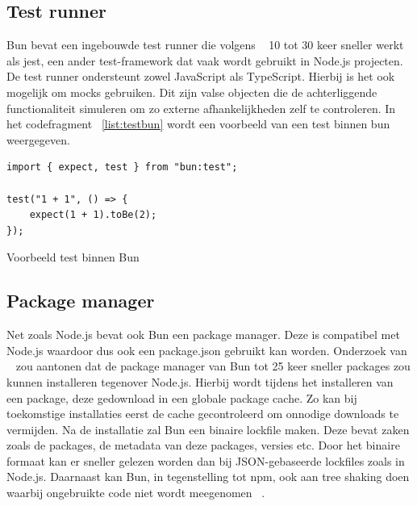 \subsection{Test runner}
Bun bevat een ingebouwde test runner die volgens ~\textcite{McDonnel2023} 10 tot 30 keer sneller werkt als jest, een ander test-framework dat vaak wordt gebruikt in Node.js projecten.
De test runner ondersteunt zowel JavaScript als TypeScript. Hierbij is het ook mogelijk om mocks gebruiken.
Dit zijn valse objecten die de achterliggende functionaliteit simuleren om zo externe afhankelijkheden zelf te controleren.
In het codefragment ~\ref{list:testbun} wordt een voorbeeld van een test binnen bun weergegeven.
\begin{listing}[H]
    \centering
    \begin{verbatim}
import { expect, test } from "bun:test";

test("1 + 1", () => {
    expect(1 + 1).toBe(2);
});
        \end{verbatim}
        \caption{\label{list:testbun}Voorbeeld test binnen Bun ~\autocite{McDonnel2023}}
\end{listing}

\subsection{Package manager}
Net zoals Node.js bevat ook Bun een package manager. 
Deze is compatibel met Node.js waardoor dus ook een package.json gebruikt kan worden.
Onderzoek van ~\textcite{McDonnel2023} zou aantonen dat de package manager 
van Bun tot 25 keer sneller packages zou kunnen installeren tegenover Node.js.
Hierbij wordt tijdens het installeren van een package, 
deze gedownload in een globale package cache. Zo kan bij toekomstige installaties 
eerst de cache gecontroleerd om onnodige downloads te vermijden. Na de installatie zal Bun een binaire lockfile maken. 
Deze bevat zaken zoals de packages, de metadata van deze packages, versies etc. Door het binaire formaat kan er sneller gelezen worden dan bij JSON-gebaseerde lockfiles zoals in Node.js.
Daarnaast kan Bun, in tegenstelling tot npm, ook aan tree shaking doen waarbij ongebruikte code niet wordt meegenomen ~\autocite{Aghdasi2023}.


